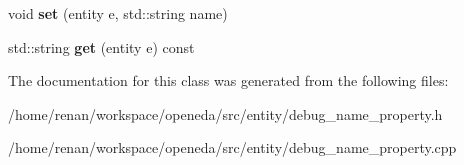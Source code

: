 \begin{DoxyCompactItemize}
\item 
\hypertarget{classopeneda_1_1entity_1_1debug__name__property_a342dd0b13afc4434ee5dcf0d8eb24cdf}{void {\bfseries set} (entity e, std\-::string name)}\label{classopeneda_1_1entity_1_1debug__name__property_a342dd0b13afc4434ee5dcf0d8eb24cdf}

\item 
\hypertarget{classopeneda_1_1entity_1_1debug__name__property_a58e636400ca2842cac3ee6c9298f5ded}{std\-::string {\bfseries get} (entity e) const }\label{classopeneda_1_1entity_1_1debug__name__property_a58e636400ca2842cac3ee6c9298f5ded}

\end{DoxyCompactItemize}


The documentation for this class was generated from the following files\-:\begin{DoxyCompactItemize}
\item 
/home/renan/workspace/openeda/src/entity/debug\-\_\-name\-\_\-property.\-h\item 
/home/renan/workspace/openeda/src/entity/debug\-\_\-name\-\_\-property.\-cpp\end{DoxyCompactItemize}
